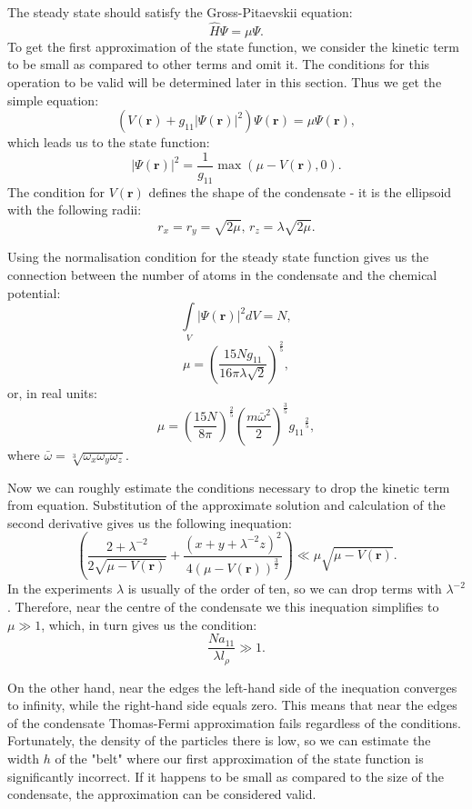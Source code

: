 \documentclass[12pt,notitlepage]{report}
\begin{document}
The steady state should satisfy the Gross-Pitaevskii equation:
\[ \hat{H} \Psi = \mu \Psi. \]
To get the first approximation of the state function, we consider the kinetic term to be small as compared to other terms and omit it. The conditions for this operation to be valid will be determined later in this section. Thus we get the simple equation:
\[ \left( V(\mathbf{r}) + g_{11} \vert \Psi(\mathbf{r}) \vert^2 \right) \Psi(\mathbf{r}) = \mu \Psi(\mathbf{r}), \]
which leads us to the state function:
\[ \vert \Psi(\mathbf{r}) \vert^2 = \frac{1}{g_{11}} \max \left( \mu - V(\mathbf{r}), 0 \right). \]
The condition for $V(\mathbf{r})$ defines the shape of the condensate - it is the ellipsoid with the following radii:
\[ r_x = r_y = \sqrt{2\mu},\, r_z = \lambda \sqrt{2\mu}. \]

Using the normalisation condition for the steady state function gives us the connection between the number of atoms in the condensate and the chemical potential:
\[ \int\limits_{V} \vert \Psi(\mathbf{r}) \vert^2 dV = N, \]
\[ \mu = \left( \frac{15 N g_{11}}{16 \pi \lambda \sqrt{2}} \right)^{\frac{2}{5}}, \]
or, in real units:
\[ 
\mu = \left( \frac{15 N}{8 \pi} \right)^\frac{2}{5} 
\left( \frac{m \bar{\omega}^2}{2} \right)^\frac{3}{5}
{g_{11}}^\frac{2}{5},
\]
where $\bar{\omega} = \sqrt[3]{\omega_x \omega_y \omega_z}$.

Now we can roughly estimate the conditions necessary to drop the kinetic term from equation. Substitution of the approximate solution and calculation of the second derivative gives us the following inequation:
\[
\left( 
	\frac{2 + \lambda^{-2}}{2 \sqrt{\mu - V(\mathbf{r})}} +
	\frac{\left( x + y + \lambda^{-2}z \right)^2}{4 \left( \mu - V(\mathbf{r}) \right)^{\frac{3}{2}}} 
\right) \ll
\mu \sqrt{\mu - V(\mathbf{r})}.
\]
In the experiments $\lambda$ is usually of the order of ten, so we can drop terms with $\lambda^{-2}$. Therefore, near the centre of the condensate we this inequation simplifies to $\mu \gg 1$, which, in turn gives us the condition:
\[ \frac{N a_{11}}{\lambda l_\rho} \gg 1. \]

On the other hand, near the edges the left-hand side of the inequation converges to infinity, while the right-hand side equals zero. This means that near the edges of the condensate Thomas-Fermi approximation fails regardless of the conditions. Fortunately, the density of the particles there is low, so we can estimate the width $h$ of the "belt" where our first approximation of the state function is significantly incorrect. If it happens to be small as compared to the size of the condensate, the approximation can be considered valid.
\end{document}
